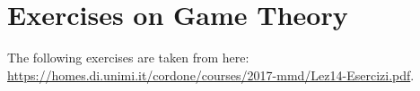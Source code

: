 \documentclass[\main/main.tex]{subfiles}
\begin{document}
\section{Exercises on Game Theory}
The following exercises are taken from here: \url{https://homes.di.unimi.it/cordone/courses/2017-mmd/Lez14-Esercizi.pdf}.

\clearpage

\clearpage

\clearpage

\clearpage

\end{document}
